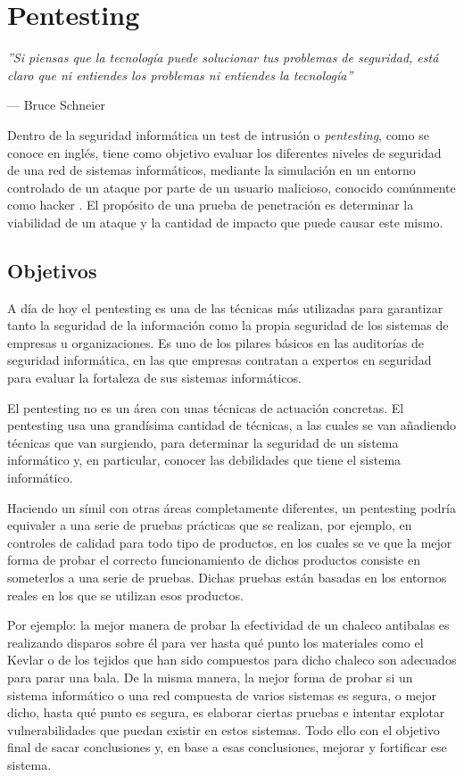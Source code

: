 \chapter{Pentesting}

\epigraph{\textit{''Si piensas que la tecnología puede solucionar tus problemas de seguridad, está claro que ni entiendes los problemas ni entiendes la tecnología''}}{--- Bruce Schneier}

Dentro de la seguridad informática un test de intrusión o \textit{pentesting}, como se conoce en inglés, tiene como objetivo evaluar los diferentes niveles de seguridad de una red de sistemas informáticos, mediante la simulación en un entorno controlado de un ataque por parte de un usuario malicioso, conocido comúnmente como hacker \cite{pentesting-kali}. El propósito de una prueba de penetración es determinar la viabilidad de un ataque y la cantidad de impacto que puede causar este mismo.

\section{Objetivos}

A día de hoy el pentesting es una de las técnicas más utilizadas para garantizar tanto la seguridad de la información como la propia seguridad de los sistemas de empresas u organizaciones. Es uno de los pilares básicos en las auditorías de seguridad informática, en las que empresas contratan a expertos en seguridad para evaluar la fortaleza de sus sistemas informáticos.

El pentesting no es un área con unas técnicas de actuación concretas. El pentesting usa una grandísima cantidad de técnicas, a las cuales se van añadiendo técnicas que van surgiendo, para determinar la seguridad de un sistema informático y, en particular, conocer las debilidades que tiene el sistema informático.

Haciendo un símil con otras áreas completamente diferentes, un pentesting podría equivaler a una serie de pruebas prácticas que se realizan, por ejemplo, en controles de calidad para todo tipo de productos, en los cuales se ve que la mejor forma de probar el correcto funcionamiento de dichos productos consiste en someterlos a una serie de pruebas. Dichas pruebas están basadas en los entornos reales en los que se utilizan esos productos.

Por ejemplo: la mejor manera de probar la efectividad de un chaleco antibalas es realizando disparos sobre él para ver hasta qué punto los materiales como el Kevlar o de los tejidos que han sido compuestos para dicho chaleco son adecuados para parar una bala. De la misma manera, la mejor forma de probar si un sistema informático o una red compuesta de varios sistemas es segura, o mejor dicho, hasta qué punto es segura, es elaborar ciertas pruebas e intentar explotar vulnerabilidades que puedan existir en estos sistemas. Todo ello con el objetivo final de sacar conclusiones y, en base a esas conclusiones, mejorar y fortificar ese sistema.

